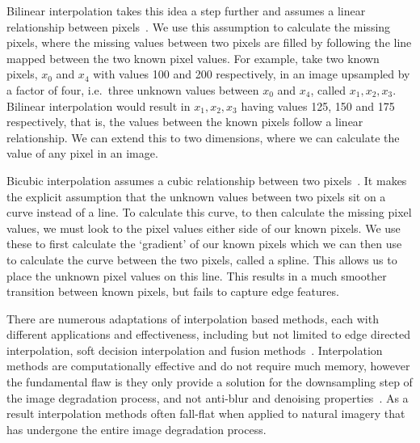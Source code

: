 Bilinear interpolation takes this idea a step further and assumes a linear relationship between pixels~\cite{bilnearInterpolation}. We use this assumption to calculate the missing pixels, where the missing values between two pixels are filled by following the line mapped between the two known pixel values. For example, take two known pixels, $x_0$ and $x_4$ with values 100 and 200 respectively, in an image upsampled by a factor of four, i.e.\ three unknown values between $x_0$ and $x_4$, called $x_1, x_2, x_3$. Bilinear interpolation would result in $x_1, x_2, x_3$ having values 125, 150 and 175 respectively, that is, the values between the known pixels follow a linear relationship. We can extend this to two dimensions, where we can calculate the value of any pixel in an image.

Bicubic interpolation assumes a cubic relationship between two pixels~\cite{bicubicInterpolation}. It makes the explicit assumption that the unknown values between two pixels sit on a curve instead of a line. To calculate this curve, to then calculate the missing pixel values, we must look to the pixel values either side of our known pixels. We use these to first calculate the `gradient' of our known pixels which we can then use to calculate the curve between the two pixels, called a spline. This allows us to place the unknown pixel values on this line. This results in a much smoother transition between known pixels, but fails to capture edge features.

There are numerous adaptations of interpolation based methods, each with different applications and effectiveness, including but not limited to edge directed interpolation, soft decision interpolation and fusion methods~\cite{interpolation}. Interpolation methods are computationally effective and do not require much memory, however the fundamental flaw is they only provide a solution for the downsampling step of the image degradation process, and not anti-blur and denoising properties~\cite{interpolation}. As a result interpolation methods often fall-flat when applied to natural imagery that has undergone the entire image degradation process. 

